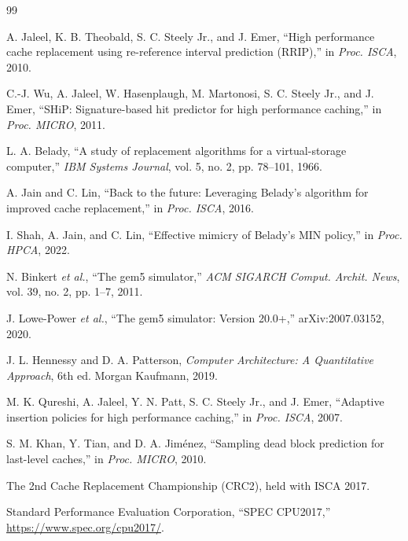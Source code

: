 \documentclass[10pt,journal,compsoc]{IEEEtran}
\begin{document}
\begin{thebibliography}{99}

A. Jaleel, K. B. Theobald, S. C. Steely Jr., and J. Emer, ``High performance
cache replacement using re-reference interval prediction (RRIP),'' in
\emph{Proc. ISCA}, 2010.

C.-J. Wu, A. Jaleel, W. Hasenplaugh, M. Martonosi, S. C. Steely Jr., and
J. Emer, ``SHiP: Signature-based hit predictor for high performance caching,''
in \emph{Proc. MICRO}, 2011.

L. A. Belady, ``A study of replacement algorithms for a virtual-storage
computer,'' \emph{IBM Systems Journal}, vol. 5, no. 2, pp. 78--101, 1966.

A. Jain and C. Lin, ``Back to the future: Leveraging Belady's algorithm for
improved cache replacement,'' in \emph{Proc. ISCA}, 2016.

I. Shah, A. Jain, and C. Lin, ``Effective mimicry of Belady's MIN policy,'' in
\emph{Proc. HPCA}, 2022.

N. Binkert \emph{et al.}, ``The gem5 simulator,'' \emph{ACM SIGARCH Comput.
Archit. News}, vol. 39, no. 2, pp. 1--7, 2011.

J. Lowe-Power \emph{et al.}, ``The gem5 simulator: Version 20.0+,''
arXiv:2007.03152, 2020.

J. L. Hennessy and D. A. Patterson, \emph{Computer Architecture: A Quantitative
Approach}, 6th ed. Morgan Kaufmann, 2019.

M. K. Qureshi, A. Jaleel, Y. N. Patt, S. C. Steely Jr., and J. Emer, ``Adaptive
insertion policies for high performance caching,'' in \emph{Proc. ISCA}, 2007.

S. M. Khan, Y. Tian, and D. A. Jim\'enez, ``Sampling dead block prediction for
last-level caches,'' in \emph{Proc. MICRO}, 2010.

The 2nd Cache Replacement Championship (CRC2), held with ISCA 2017.

Standard Performance Evaluation Corporation, ``SPEC CPU2017,''
\url{https://www.spec.org/cpu2017/}.

\end{thebibliography}
\end{document}
